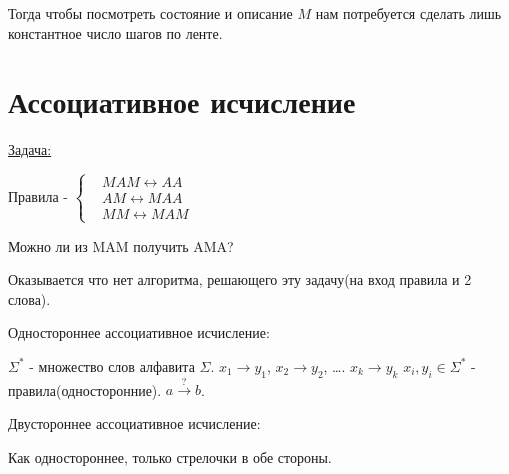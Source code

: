 Тогда чтобы посмотреть состояние и описание $M$ нам потребуется сделать лишь константное число шагов по ленте.

\section{Ассоциативное исчисление}
\underline{Задача:}

Правила - $\left\{
	\begin{aligned}
	&MAM \longleftrightarrow AA \\
	&AM \longleftrightarrow MAA \\
	&MM \longleftrightarrow MAM 
	\end{aligned}
\right.$

Можно ли из MAM получить AMA? 

Оказывается что нет алгоритма, решающего эту задачу(на вход правила и 2 слова).

\begin{Def}
	Одностороннее ассоциативное исчисление:
	
	$\Sigma^{*}$ - множество слов алфавита $\Sigma$. $x_1 \rightarrow y_1$, $x_2 \rightarrow y_2$, \dots. $x_k \rightarrow y_k$
	$x_i, y_i \in \Sigma^{*}$ - правила(односторонние). $a \xrightarrow{?} b$.

    Двустороннее ассоциативное исчисление:

    Как одностороннее, только стрелочки в обе стороны.
\end{Def}

